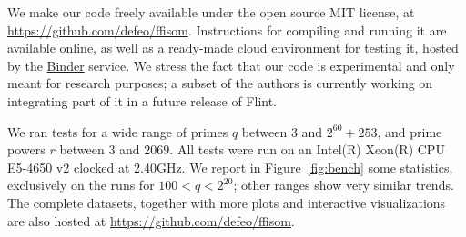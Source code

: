 We make our code freely available under the open source MIT license,
at \url{https://github.com/defeo/ffisom}. %
Instructions for compiling and running it are available online, as
well as a ready-made cloud environment for testing it, hosted by the
\href{https://mybinder.org/}{Binder} service. %
We stress the fact that our code is experimental and only meant for
research purposes; a subset of the authors is currently working on
integrating part of it in a future release of Flint.

We ran tests for a wide range of primes $q$ between $3$ and
$2^{60}+253$, and prime powers $r$ between $3$ and $2069$. %
All tests were run on an Intel(R) Xeon(R) CPU E5-4650 v2 clocked at
2.40GHz. %
We report in Figure~\ref{fig:bench} some statistics, exclusively on
the runs for $100<q<2^{20}$; other ranges show very similar trends. %
The complete datasets, together with more plots and interactive
visualizations are also hosted at
\url{https://github.com/defeo/ffisom}.

